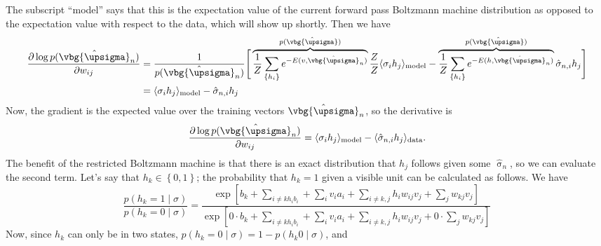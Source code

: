 \documentclass{report}
\begin{document}
The subscript ``model'' says that this is the expectation value of the 
current forward pass Boltzmann machine distribution as opposed to the 
expectation value with respect to the data, which will show up shortly. 
Then we have 
\begin{align*}
	\frac{\partial \log p(\hat{\vbg{\upsigma}}_n)}{\partial w_{ij}}
		&= \frac{1}{p(\hat{\vbg{\upsigma}}_n)} \Bigg[
			\overbrace{\frac{1}{Z}\sum_{\left\{h_i\right\}} e^{-E(v,\hat{\vbg{\upsigma}}_n)}}^{p(\hat{\vbg{\upsigma}})}
			\frac{Z}{Z} \langle \sigma_i h_j \rangle_{\text{model}}
			- \overbrace{\frac{1}{Z} \sum_{\left\{h_i\right\}} 
			e^{-E(h, \hat{\vbg{\upsigma}}_n)}}^{p(\hat{\vbg{\upsigma}})}
			 \hat{\sigma}_{n,i} h_j
			\Bigg]\\
		&= \langle \sigma_i h_j \rangle_{\text{model}} 
			- \hat{\sigma}_{n,i} h_j
\end{align*}
Now, the gradient is the expected value over the training vectors $ \hat{\vbg{\upsigma}}_n $, 
so the derivative is
\begin{equation*}
	\frac{\partial \log p(\hat{\vbg{\upsigma}}_n)}{\partial w_{ij}}
	= \langle \sigma_i h_j \rangle_{\text{model}} 
		- \langle\hat{\sigma}_{n,i} h_j\rangle_{\text{data}}.
\end{equation*}
The benefit of the restricted Boltzmann machine is that there is an exact 
distribution that $ h_j $ follows given some $ \hat{\upsigma}_n $, so we 
can evaluate the second term. Let's say that $ h_k\in\left\{0,1\right\} $; 
the probability that $ h_k = 1$ given a visible unit can be calculated as follows. 
We have 
\begin{equation*}
	\frac{p(h_k=1\mid \sigma)}{p(h_k=0\mid \sigma)}
		= \frac{
			\exp\left[b_k + \sum_{i\neq k h_i b_i} + \sum_i v_i a_i + \sum_{i\neq k, j}h_i w_{ij} v_j
				+ \sum_j w_{kj} v_j\right]
		}{
			\exp\left[0\cdot b_k + \sum_{i\neq k h_i b_i} + \sum_i v_i a_i + \sum_{i\neq k, j}h_i w_{ij} v_j
				+ 0\cdot \sum_j w_{kj} v_j\right]
		}
\end{equation*}
Now, since $ h_k $ can only be in two states, $ p(h_k = 0\mid \sigma) = 1- p(h_k 0\mid\sigma)$, and 
\end{document}

